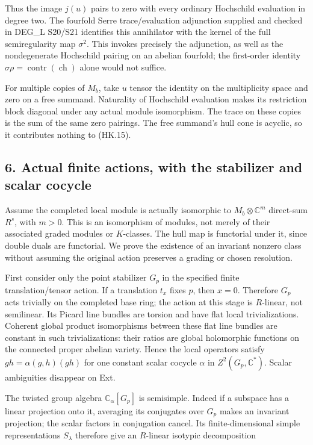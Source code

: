 Thus the image \(j(u)\) pairs to zero with every ordinary Hochschild
evaluation in degree two. The fourfold Serre trace/evaluation
adjunction supplied and checked in DEG\_L S20/S21 identifies this
annihilator with the kernel of the full semiregularity map \(\sigma^2\).
This invokes precisely the adjunction, as well as the nondegenerate
Hochschild pairing on an abelian fourfold; the first-order identity
\(\sigma\rho=\operatorname{contr}(\operatorname{ch})\) alone would not suffice.

For multiple copies of \(M_b\), take \(u\) tensor the identity on the
multiplicity space and zero on a free summand. Naturality of
Hochschild evaluation makes its restriction block diagonal under
any actual module isomorphism. The trace on these copies is the
sum of the same zero pairings. The free summand's hull cone is
acyclic, so it contributes nothing to (HK.15).

\subsection{6. Actual finite actions, with the stabilizer and scalar cocycle}\label{SF-E846:s6}

Assume the completed local module is actually isomorphic to
\(M_b\otimes\mathbb C^m\) direct-sum \(R^s\), with \(m>0\). This is an isomorphism of
modules, not merely of their associated graded modules or \(K\)-classes.
The hull map is functorial under it, since double duals are functorial.
We prove the existence of an invariant nonzero class without
assuming the original action preserves a grading or chosen resolution.

First consider only the point stabilizer \(G_p\) in the specified finite
translation/tensor action. If a translation \(t_x\) fixes \(p\), then \(x=0\).
Therefore \(G_p\) acts trivially on the completed base ring; the action
at this stage is \(R\)-linear, not semilinear. Its Picard line bundles
are torsion and have flat local trivializations. Coherent global
product isomorphisms between these flat line bundles are constant
in such trivializations: their ratios are global holomorphic
functions on the connected proper abelian variety. Hence the
local operators satisfy \(gh=\alpha(g,h)(gh)\) for one constant scalar
cocycle \(\alpha\) in \(Z^2(G_p,\mathbb C^*)\). Scalar ambiguities disappear on Ext.

The twisted group algebra \(\mathbb C_\alpha[G_p]\) is semisimple. Indeed if a
subspace has a linear projection onto it, averaging its conjugates
over \(G_p\) makes an invariant projection; the scalar factors in
conjugation cancel. Its finite-dimensional simple representations
\(S_\lambda\) therefore give an \(R\)-linear isotypic decomposition

